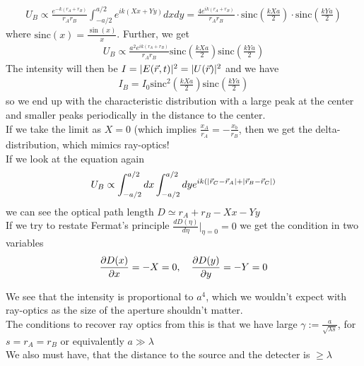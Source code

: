 \begin{align*}
				U_B \propto \frac{e^{-k(r_A + r_B)}}{r_Ar_B}\int_{-a/2}^{a/2} e^{ik(Xx + Yy)}dxdy = \frac{4 e^{ik(r_A + r_B)}}{r_Ar_B} \cdot \text{sinc} \left(\frac{kXa}{2}\right) \cdot \text{sinc} \left(\frac{kYa}{2}\right)
\end{align*}
where $\text{sinc}(x) = \frac{\sin(x)}{x}$. Further, we get
\begin{align*}
				U_B \propto \frac{a^2 e^{ik(r_A + r_B)}}{r_Ar_B}\text{sinc} \left(\frac{kXa}{2}\right) \text{sinc} \left(\frac{kYa}{2}\right)
\end{align*}
The intensity will then be $I = \vert E(\vec{r},t)\vert^2 = \vert U(\vec{r})\vert^2$ and we have
\begin{align*}
				I_B = I_0 \text{sinc}^2 \left(\frac{kXa}{2}\right) \text{sinc} \left(\frac{kYa}{2}\right)
\end{align*}
so we end up with the characteristic distribution with a large peak at the center and smaller peaks periodically in the distance to the center.\\
If we take the limit as $X = 0$ (which implies $\frac{x_A}{r_A} = - \frac{x_b}{r_B}$, then we get the delta-distribution, which mimics ray-optics!\\

If we look at the equation again
\begin{align*}
				U_B \propto \int_{-a/2}^{a/2}dx \int_{-a/2}^{a/2}dy e^{ik(\vert\vec{r}_C - \vec{r}_A\vert + \vert\vec{r}_B - \vec{r}_C\vert)}
\end{align*}
we can see the optical path length $D \simeq r_A + r_B - Xx - Yy$\\

If we try to restate Fermat's principle $\frac{d D(\eta)}{d\eta}|_{\eta = 0} = 0$ we get the condition in two variables
\begin{align*}
				\frac{\partial D(x)}{\partial x} = -X = 0, \quad \frac{\partial D(y)}{\partial y} = -Y = 0
\end{align*}


We see that the intensity is proportional to $a^4$, which we wouldn't expect with ray-optics as the size of the aperture shouldn't matter.\\
The conditions to recover ray optics from this is that we have large $\gamma := \frac{a}{\sqrt{\lambda s}}$, for $s = r_A = r_B$ or equivalently $a \gg \lambda$\\
We also must have, that the distance to the source and the detecter is $\geq \lambda$\\

